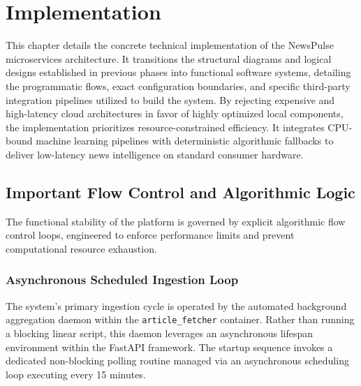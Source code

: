 \chapter{Implementation}
\label{ch:implementation-chapter}
\newpage

This chapter details the concrete technical implementation of the NewsPulse microservices architecture. It transitions the structural diagrams and logical designs established in previous phases into functional software systems, detailing the programmatic flows, exact configuration boundaries, and specific third-party integration pipelines utilized to build the system. By rejecting expensive and high-latency cloud architectures in favor of highly optimized local components, the implementation prioritizes resource-constrained efficiency. It integrates CPU-bound machine learning pipelines with deterministic algorithmic fallbacks to deliver low-latency news intelligence on standard consumer hardware.

\section{Important Flow Control and Algorithmic Logic}
The functional stability of the platform is governed by explicit algorithmic flow control loops, engineered to enforce performance limits and prevent computational resource exhaustion.

\subsection{Asynchronous Scheduled Ingestion Loop}
The system's primary ingestion cycle is operated by the automated background aggregation daemon within the \texttt{article\_fetcher} container. Rather than running a blocking linear script, this daemon leverages an asynchronous lifespan environment within the FastAPI framework. The startup sequence invokes a dedicated non-blocking polling routine managed via an asynchronous scheduling loop executing every 15 minutes. 

